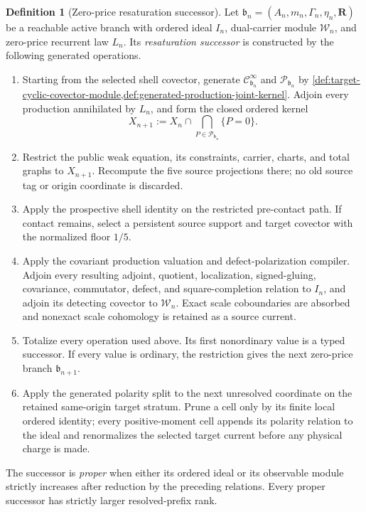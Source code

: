 \documentclass[11pt]{article}
\numberwithin{section}{part}
\theoremstyle{plain}
\theoremstyle{definition}
\newtheorem{definition}[definition]{Definition}
\theoremstyle{remark}
\begin{document}
\begin{definition}[Zero-price resaturation successor]
\label{def:zero-price-resaturation-successor}
Let
\(\mathfrak b_n=(A_n,m_n,\Gamma_n,\eta_n,\mathbf R)\) be a reachable active
branch with ordered ideal \(I_n\), dual-carrier module \(\mathscr W_n\), and
zero-price recurrent law \(L_n\).  Its \emph{resaturation successor} is
constructed by the following generated operations.
\begin{enumerate}[label=\textup{(R\arabic*)}]
\item Starting from the selected shell covector, generate
\(\mathscr C^\infty_{\mathfrak b_n}\) and
\(\mathscr P_{\mathfrak b_n}\) by
\cref{def:target-cyclic-covector-module,def:generated-production-joint-kernel}.
Adjoin every production annihilated by \(L_n\), and form the closed ordered
kernel
\begin{equation}
 \label{eq:zero-price-kernel-restriction}
 X_{n+1}:=X_n\cap\bigcap_{P\in\mathscr P_{\mathfrak b_n}}\{P=0\}.
\end{equation}
\item Restrict the public weak equation, its constraints, carrier, charts,
and total graphs to \(X_{n+1}\).  Recompute the five source projections there;
no old source tag or origin coordinate is discarded.
\item Apply the prospective shell identity on the restricted pre-contact
path.  If contact remains, select a persistent source support and target
covector with the normalized floor \(1/5\).
\item Apply the covariant production valuation and defect-polarization
compiler.  Adjoin every resulting adjoint, quotient, localization,
signed-gluing, covariance, commutator, defect, and square-completion relation
to \(I_n\), and adjoin its detecting covector to \(\mathscr W_n\).  Exact
scale coboundaries are absorbed and nonexact scale cohomology is retained as
a source current.
\item Totalize every operation used above.  Its first nonordinary value is a
typed successor.  If every value is ordinary, the restriction gives the next
zero-price branch \(\mathfrak b_{n+1}\).
\item Apply the generated polarity split to the next unresolved coordinate
on the retained same-origin target stratum.  Prune a cell only by its finite
local ordered identity; every positive-moment cell appends its polarity
relation to the ideal and renormalizes the selected target current before any
physical charge is made.
\end{enumerate}
The successor is \emph{proper} when either its ordered ideal or its observable
module strictly increases after reduction by the preceding relations.  Every
proper successor has strictly larger resolved-prefix rank.
\end{definition}
\end{document}
